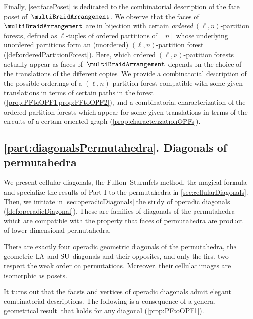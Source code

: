 Finally, \cref{sec:facePoset} is dedicated to the combinatorial description of the face poset of~$\multiBraidArrangement$.
We observe that the faces of~$\multiBraidArrangement$ are in bijection with certain \emph{ordered} $(\ell,n)$-partition forests, defined as $\ell$-tuples of ordered partitions of~$[n]$ whose underlying unordered partitions form an (unordered) $(\ell,n)$-partition forest (\cref{def:orderedPartitionForest}).
Here, which ordered $(\ell,n)$-partition forests actually appear as faces of~$\multiBraidArrangement$ depends on the choice of the translations of the different copies.
We provide a combinatorial description of the possible orderings of a $(\ell,n)$-partition forest compatible with some given translations in terms of certain paths in the forest (\cref{prop:PFtoOPF1,prop:PFtoOPF2}), and a combinatorial characterization of the ordered partition forests which appear for some given translations in terms of the circuits of a certain oriented graph (\cref{prop:characterizationOPFs}).


\subsection*{\cref{part:diagonalsPermutahedra}. Diagonals of permutahedra}

We present cellular diagonals, the Fulton--Sturmfels method, the magical formula and specialize the results of Part I to the permutahedra in \cref{sec:cellularDiagonals}.
Then, we initiate in \cref{sec:operadicDiagonals} the study of operadic diagonals (\cref{def:operadicDiagonal}).
These are families of diagonals of the permutahedra which are compatible with the property that faces of permutahedra are product of lower-dimensional permutahedra. 

\begin{theorem*}
There are exactly four operadic geometric diagonals of the permutahedra, the geometric $\mathrm{LA}$ and $\mathrm{SU}$ diagonals and their opposites, and only the first two respect the weak order on permutations.
Moreover, their cellular images are isomorphic as posets.
\end{theorem*}

It turns out that the facets and vertices of operadic diagonals admit elegant combinatorial descriptions. 
The following is a consequence of a general geometrical result, that holds for any diagonal (\cref{prop:PFtoOPF1}).


